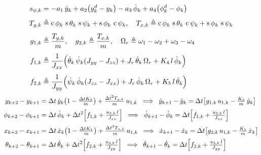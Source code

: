 \documentclass[conf]{new-aiaa}
\DeclareMathOperator{\s}{s}
\DeclareMathOperator{\cs}{c}
\begin{document}
\begin{samepage}
    \begingroup
\small
\begin{align}
s_{\phi,k}
&= -a_1\,\dot y_k
+ a_2\!\left(y_k^d - y_k\right)
- a_3\,\dot\phi_k
+ a_4\!\left(\phi_k^d - \phi_k\right) \notag \\[4pt]
T_{y,k} &\triangleq
\cs\phi_k\,\s\theta_k\,\s\psi_k
+ \s\phi_k\,\cs\psi_k,
\quad T_{x,k} \triangleq
\cs\phi_k\,\s\theta_k\,\cs\psi_k
+ \s\phi_k\,\s\psi_k \notag \\[4pt]
g_{1,k} &\triangleq \frac{T_{y,k}}{m}, \quad
g_{2,k} \triangleq \frac{T_{x,k}}{m}, \quad
\Omega_r \triangleq \omega_1 - \omega_2 + \omega_3 - \omega_4 \notag \\[4pt]
f_{1,k} &\triangleq \frac{1}{J_{xx}}\Bigl(
\dot\theta_k\,\dot\psi_k\!\left(J_{yy} - J_{zz}\right)
 + J_r\,\dot\theta_k\,\Omega_r
 + K_4\,l\,\dot\phi_k
\Bigr) \notag \\[4pt]
f_{2,k} &\triangleq \frac{1}{J_{yy}}\Bigl(
\dot\psi_k\,\dot\phi_k\!\left(J_{zz} - J_{xx}\right)
 + J_r\,\dot\phi_k\,\Omega_r
 + K_5\,l\,\dot\theta_k
\Bigr)
\end{align}
\begin{align}
y_{k+2} - y_{k+1}
&= \Delta t\,\dot y_k\!\left(1 - \tfrac{\Delta t K_2}{m}\right) + \tfrac{\Delta t^2 T_{y,k}}{m}\,u_{1,k}
\;\;\Longrightarrow\;\; \dot y_{k+1} - \dot y_k = \Delta t\!\left[ g_{1,k}\,u_{1,k} - \tfrac{K_2}{m}\,\dot y_k \right] \notag \\[2pt]
\phi_{k+2} - \phi_{k+1}
&= \Delta t\,\dot\phi_k + \Delta t^2\!\left[ f_{1,k} + \tfrac{u_{2,k}\,l}{J_{xx}} \right]
\;\;\Longrightarrow\;\; \dot\phi_{k+1} - \dot\phi_k = \Delta t\!\left[ f_{1,k} + \tfrac{u_{2,k}\,l}{J_{xx}} \right] \notag \\[2pt]
x_{k+2} - x_{k+1}
&= \Delta t\,\dot x_k\!\left(1 - \tfrac{\Delta t K_1}{m}\right) + \tfrac{\Delta t^2 T_{x,k}}{m}\,u_{1,k}
\;\;\Longrightarrow\;\; \dot x_{k+1} - \dot x_k = \Delta t\!\left[ g_{2,k}\,u_{1,k} - \tfrac{K_1}{m}\,\dot x_k \right] \notag \\[2pt]
\theta_{k+2} - \theta_{k+1}
&= \Delta t\,\dot\theta_k + \Delta t^2\!\left[ f_{2,k} + \tfrac{u_{3,k}\,l}{J_{yy}} \right]
\;\;\Longrightarrow\;\; \dot\theta_{k+1} - \dot\theta_k = \Delta t\!\left[ f_{2,k} + \tfrac{u_{3,k}\,l}{J_{yy}} \right]

\end{align}
\end{samepage}
\end{document}
